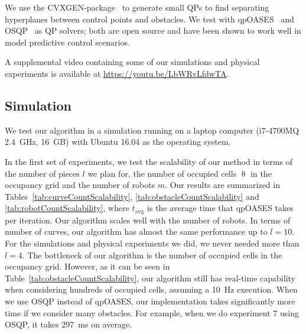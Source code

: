 \documentclass{svproc}
\begin{document}
We use the CVXGEN-package~\cite{cvxgen} to generate small QPs to find separating hyperplanes between control points and obstacles.
We test with qpOASES~\cite{qpOASES} and OSQP~\cite{osqp} as QP solvers; both are open source and have been shown to work well in model predictive control scenarios. 

A supplemental video containing some of our simulations and physical experiments is available at \url{https://youtu.be/LbWRvLfdwTA}.%

\subsection{Simulation}\label{simulationSection}
We test our algorithm in a simulation running on a laptop computer (i7-4700MQ \SI{2.4}{GHz}, \SI{16}{GB}) with Ubuntu 16.04 as the operating system.

In the first set of experiments, we test the scalability of our method in terms of the number of pieces $l$ we plan for, the number of occupied cells $\uptheta$ in the occupancy grid and the number of robots $m$.
Our results are summarized in Tables~\ref{tab:curveCountScalability}, \ref{tab:obstacleCountScalability} and \ref{tab:robotCountScalability}, where $t_{\text{avg}}$ is the average time that qpOASES takes per iteration.
Our algorithm scales well with the number of robots.
In terms of number of curves, our algorithm has almost the same performance up to $l=10$. For the simulations and physical experiments we did, we never needed more than $l=4$.
The bottleneck of our algorithm is the number of occupied cells in the occupancy grid. However, as it can be seen in Table~\ref{tab:obstacleCountScalability}, our algorithm still has real-time capability when considering hundreds of occupied cells, assuming a \SI{10}{Hz} execution.
When we use OSQP instead of qpOASES, our implementation takes significantly more time if we consider many obstacles.
For example, when we do experiment $7$ using OSQP, it takes \SI{297}{ms} on average.
\end{document}
